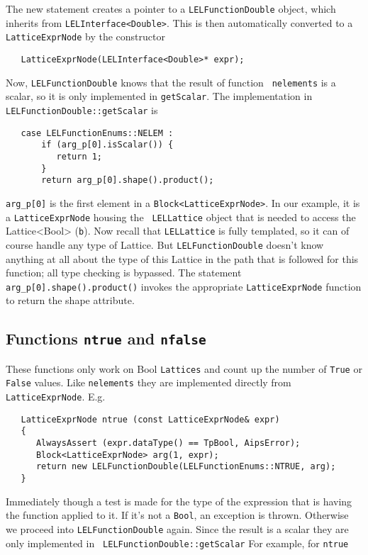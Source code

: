 The new statement creates a pointer to a {\tt LELFunctionDouble} object,
which inherits from {\tt LELInterface<Double>}.  This is then
automatically converted to a {\tt LatticeExprNode} by the constructor

\begin{verbatim}
   LatticeExprNode(LELInterface<Double>* expr);
\end{verbatim}

Now, {\tt LELFunctionDouble} knows that the result of function {\tt
nelements} is a scalar, so it is only implemented in {\tt getScalar}. 
The implementation in {\tt LELFunctionDouble::getScalar} is

\begin{verbatim}
   case LELFunctionEnums::NELEM :
       if (arg_p[0].isScalar()) {
          return 1;
       }
       return arg_p[0].shape().product();
\end{verbatim}

{\tt arg\_p[0]} is the first element in a {\tt Block<LatticeExprNode>}. 
In our example, it is a {\tt LatticeExprNode} housing the {\tt
LELLattice} object that is needed to access the Lattice<Bool> ({\tt b}). 
Now recall that {\tt LELLattice} is fully templated, so it can of course
handle any type of Lattice.  But {\tt LELFunctionDouble} doesn't know
anything at all about the type of this Lattice in the path that is
followed for this function; all type checking is bypassed.  The
statement {\tt arg\_p[0].shape().product()} invokes the appropriate
{\tt LatticeExprNode} function to return the shape attribute.


\subsection {Functions {\tt ntrue} and {\tt nfalse}}

These functions only work on Bool {\tt Lattices} and count
up the number of {\tt True} or {\tt False} values.  Like {\tt nelements}
they are implemented directly from {\tt LatticeExprNode}.
E.g.

\begin{verbatim}
   LatticeExprNode ntrue (const LatticeExprNode& expr)   
   {
      AlwaysAssert (expr.dataType() == TpBool, AipsError);
      Block<LatticeExprNode> arg(1, expr);
      return new LELFunctionDouble(LELFunctionEnums::NTRUE, arg);
   }
\end{verbatim}


Immediately though a test is made for the type of the expression that is
having the function applied to it.  If it's not a {\tt Bool}, an
exception is thrown.  Otherwise we proceed into {\tt LELFunctionDouble}
again.  Since the result is a scalar they are only implemented in {\tt
LELFunctionDouble::getScalar} For example, for {\tt ntrue}

